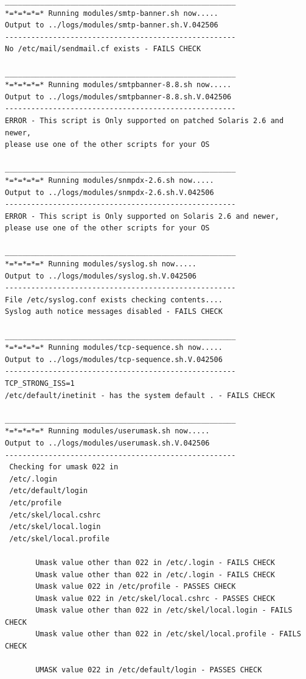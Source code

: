 \begin{verbatim}
_____________________________________________________
*=*=*=*=* Running modules/smtp-banner.sh now.....
Output to ../logs/modules/smtp-banner.sh.V.042506
-----------------------------------------------------
No /etc/mail/sendmail.cf exists - FAILS CHECK

_____________________________________________________
*=*=*=*=* Running modules/smtpbanner-8.8.sh now.....
Output to ../logs/modules/smtpbanner-8.8.sh.V.042506
-----------------------------------------------------
ERROR - This script is Only supported on patched Solaris 2.6 and newer, 
please use one of the other scripts for your OS

_____________________________________________________
*=*=*=*=* Running modules/snmpdx-2.6.sh now.....
Output to ../logs/modules/snmpdx-2.6.sh.V.042506
-----------------------------------------------------
ERROR - This script is Only supported on Solaris 2.6 and newer, 
please use one of the other scripts for your OS

_____________________________________________________
*=*=*=*=* Running modules/syslog.sh now.....
Output to ../logs/modules/syslog.sh.V.042506
-----------------------------------------------------
File /etc/syslog.conf exists checking contents....
Syslog auth notice messages disabled - FAILS CHECK

_____________________________________________________
*=*=*=*=* Running modules/tcp-sequence.sh now.....
Output to ../logs/modules/tcp-sequence.sh.V.042506
-----------------------------------------------------
TCP_STRONG_ISS=1
/etc/default/inetinit - has the system default . - FAILS CHECK

_____________________________________________________
*=*=*=*=* Running modules/userumask.sh now.....
Output to ../logs/modules/userumask.sh.V.042506
-----------------------------------------------------
 Checking for umask 022 in   
 /etc/.login
 /etc/default/login
 /etc/profile
 /etc/skel/local.cshrc
 /etc/skel/local.login
 /etc/skel/local.profile

       Umask value other than 022 in /etc/.login - FAILS CHECK
       Umask value other than 022 in /etc/.login - FAILS CHECK
       Umask value 022 in /etc/profile - PASSES CHECK
       Umask value 022 in /etc/skel/local.cshrc - PASSES CHECK
       Umask value other than 022 in /etc/skel/local.login - FAILS CHECK
       Umask value other than 022 in /etc/skel/local.profile - FAILS CHECK

       UMASK value 022 in /etc/default/login - PASSES CHECK


\end{verbatim}
